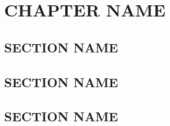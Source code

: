 \chapter{CHAPTER NAME}


\section{SECTION NAME}
\lipsum[2]

\section{SECTION NAME}
\lipsum[3]

\section{SECTION NAME}
\lipsum[2]